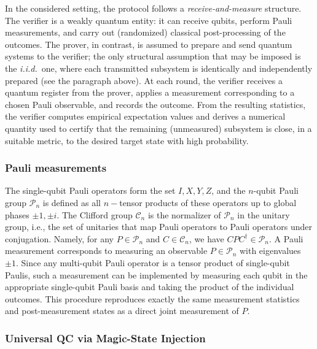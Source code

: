 \documentclass[a4paper,twocolumn,11pt,unpublished]{quantumarticle}
\newcommand{\Pauli}{\mathcal P}
\newcommand{\Clifford}{\mathcal C}
\begin{document}
In the considered setting, the protocol follows a \emph{receive-and-measure} structure. The verifier is a weakly quantum entity: it can receive qubits, perform Pauli measurements, and carry out (randomized) classical post-processing of the outcomes. The prover, in contrast, is assumed to prepare and send quantum systems to the verifier; the only structural assumption that may be imposed is the \emph{i.i.d.}\ one, where each transmitted subsystem is identically and independently prepared (see the paragraph above).
At each round, the verifier receives a quantum register from the prover, applies a measurement corresponding to a chosen Pauli observable, and records the outcome. From the resulting statistics, the verifier computes empirical expectation values and derives a numerical quantity used to certify that the remaining (unmeasured) subsystem is close, in a suitable metric, to the desired target state with high probability.

\subsubsection{Pauli measurements}
\label{subsection:prelims:Pauli meas}

The single-qubit Pauli operators form the set ${I, X, Y, Z}$, and the $n$-qubit Pauli group $\Pauli_n$ is defined as all $n-$tensor products of these operators up to global phases ${\pm 1, \pm i}$. The Clifford group $\Clifford_n$ is the normalizer of $\Pauli_n$ in the unitary group, i.e., the set of unitaries that map Pauli operators to Pauli operators under conjugation. Namely, for any $P\in\Pauli_n$ and $C\in\Clifford_n$, we have $CPC^\dagger\in \Pauli_n$.
A Pauli measurement corresponds to measuring an observable $P \in \Pauli_n$ with eigenvalues $\pm 1$. Since any multi-qubit Pauli operator is a tensor product of single-qubit Paulis, such a measurement can be implemented by measuring each qubit in the appropriate single-qubit Pauli basis and taking the product of the individual outcomes. This procedure reproduces exactly the same measurement statistics and post-measurement states as a direct joint measurement of $P$.

\subsubsection{Universal QC via Magic-State Injection}
\label{subection:prelims:MSI}
\end{document}
